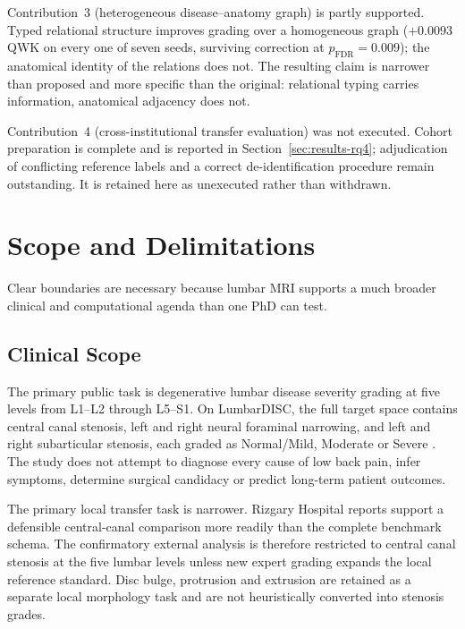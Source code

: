Contribution~3 (heterogeneous disease--anatomy graph) is partly supported. Typed
relational structure improves grading over a homogeneous graph ($+0.0093$ QWK on
every one of seven seeds, surviving correction at $p_{\mathrm{FDR}} = 0.009$);
the anatomical identity of the relations does not. The resulting
claim is narrower than proposed and more specific than the original: relational
typing carries information, anatomical adjacency does not.

Contribution~4 (cross-institutional transfer evaluation) was not executed. Cohort
preparation is complete and is reported in Section~\ref{sec:results-rq4};
adjudication of conflicting reference labels and a correct de-identification
procedure remain outstanding. It is retained here as unexecuted rather than
withdrawn.

\section{Scope and Delimitations}
\label{sec:intro-scope}

Clear boundaries are necessary because lumbar MRI supports a much broader clinical
and computational agenda than one PhD can test.

\subsection{Clinical Scope}
\label{sec:intro-scope-clinical}

The primary public task is degenerative lumbar disease severity grading at five
levels from L1--L2 through L5--S1. On LumbarDISC, the full target space contains
central canal stenosis, left and right neural foraminal narrowing, and left and
right subarticular stenosis, each graded as Normal/Mild, Moderate or Severe
\cite{richards2026the}. The study does not attempt to diagnose every cause of low
back pain, infer symptoms, determine surgical candidacy or predict long-term patient
outcomes.

The primary local transfer task is narrower. Rizgary Hospital reports support a
defensible central-canal comparison more readily than the complete benchmark schema.
The confirmatory external analysis is therefore restricted to central canal stenosis
at the five lumbar levels unless new expert grading expands the local reference
standard. Disc bulge, protrusion and extrusion are retained as a separate local
morphology task and are not heuristically converted into stenosis grades.

